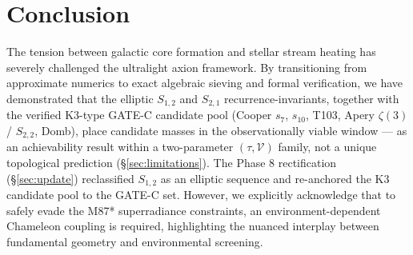 \documentclass[11pt,a4paper]{article}
\begin{document}
\section{Conclusion}
The tension between galactic core formation and stellar stream heating has severely challenged the ultralight axion framework. By transitioning from approximate numerics to exact algebraic sieving and formal verification, we have demonstrated that the elliptic $S_{1,2}$ and $S_{2,1}$ recurrence-invariants, together with the verified K3-type GATE-C candidate pool (Cooper $s_7$, $s_{10}$, T103, Apery $\zeta(3)$ / $S_{2,2}$, Domb), place candidate masses in the observationally viable window — as an achievability result within a two-parameter $(\tau,\mathcal{V})$ family, not a unique topological prediction (\S\ref{sec:limitations}). The Phase 8 rectification (\S\ref{sec:update}) reclassified $S_{1,2}$ as an elliptic sequence and re-anchored the K3 candidate pool to the GATE-C set. However, we explicitly acknowledge that to safely evade the M87* superradiance constraints, an environment-dependent Chameleon coupling is required, highlighting the nuanced interplay between fundamental geometry and environmental screening.

\vspace{1em}



\end{document}
